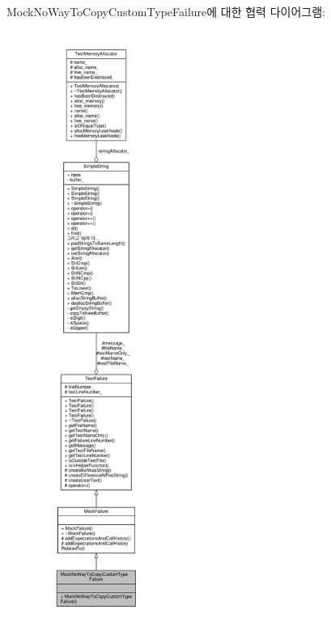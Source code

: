 Mock\+No\+Way\+To\+Copy\+Custom\+Type\+Failure에 대한 협력 다이어그램\+:
\nopagebreak
\begin{figure}[H]
\begin{center}
\leavevmode
\includegraphics[height=550pt]{class_mock_no_way_to_copy_custom_type_failure__coll__graph}
\end{center}
\end{figure}
